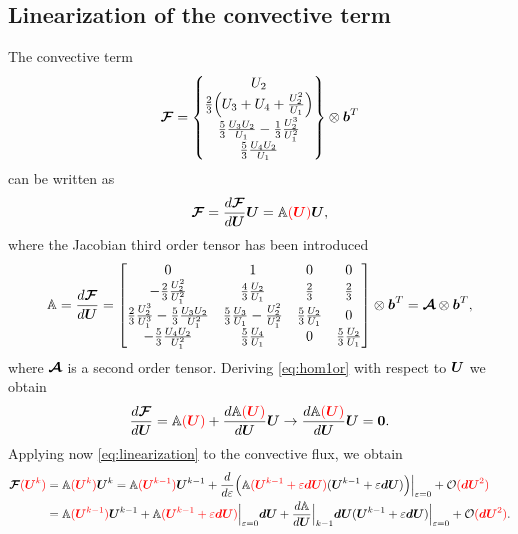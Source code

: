 \documentclass[a4paper,10pt]{article}
\newcommand{\bm}[1]{\text{\boldmath$#1$\unboldmath}}
\renewcommand{\b}{\bm{b}}
\newcommand{\DiscFunc}[1]{\bm{#1}}
\newcommand{\SecOrdTens}[1]{\bm{\mathcal{#1}}}
\renewcommand{\u}{\DiscFunc{U}}
\newcommand{\F}{\SecOrdTens{F}}
\newcommand{\A}{\SecOrdTens{A}}
\newcommand{\tot}[1]{\mathbb{#1}}  %
\newcommand{\fo}[1]{{ \color{red} ( #1 )\color{black} }} %
\begin{document}
\subsection{Linearization of the convective term}\label{sc:lin_conv}
The convective term 
\begin{equation*}
 \F =        \begin{Bmatrix}
                     U_2   \\
                  \frac{2}{3}\Big(U_3+U_4+\frac{U_2^2}{U_1}\Big) \\
                  \frac{5}{3}\frac{U_3 U_2}{U_1} -\frac{1}{3}\frac{U_2^3}{U_1^2}\\
                  \frac{5}{3} \frac{U_4 U_2}{U_1}
       \end{Bmatrix}\otimes \b^T
\end{equation*}
can be written as 
\begin{equation}\label{eq:hom1or}
 \F = \frac{d\F}{d\u}\u=\tot{A}\fo{\u} \u,
\end{equation}
where the Jacobian third order tensor has been introduced
%
\begin{equation*}
 \tot{A} = \frac{d\F}{d\u}=
                                  \begin{bmatrix}
                 0            &            1           &             0            &             0\\ 
     -\frac{2}{3} {\frac{ U_2^2}{U_1^2}} & \frac{4}{3} {\frac {U_2}{U_1}}&\frac{2}{3} & \frac{2}{3}\\ 
\frac{2}{3} \frac {U_2^3}{U_1^3}-\frac{5}{3}\frac{U_3 U_2}{U_1^2} 
& \frac{5}{3}\frac{U_3}{U_1}-\frac{U_2^2}{U_1^2}
 & \frac{5}{3} \frac { U_2}{U_1} & 0 \\ 
-\frac{5}{3} \frac {U_4 U_2}{U_1^2} & \frac{5}{3} \frac{U_4}{U_1} & 0 & \frac{5}{3} \frac { U_2}{U_1}
 \end{bmatrix}\otimes \b^T =\A\otimes\b^T,
\end{equation*}
where $\A$ is a second order tensor.
%
Deriving \eqref{eq:hom1or} with respect to $\u$ we obtain 
\begin{equation}\label{eq:rel1}
 \frac{d\F}{d\u} = \tot{A}\fo{\u} + \frac{d\tot{A}\fo{\u}}{d\u} \u \rightarrow \frac{d\tot{A}\fo{\u}}{d\u} \u = \bm{0}.
\end{equation}
Applying now \eqref{eq:linearization} to the convective flux, we obtain
\begin{equation*}
\begin{split}
 \F\fo{\u^k} &= \tot{A}\fo{\u^k}\u^k = \tot{A}\fo{\u^{k-1}}\u^{k-1}+\frac{d}{d\varepsilon}\Big(\tot{A}\fo{\u^{k-1}+\varepsilon\bm{dU}}(\u^{k-1}+\varepsilon\bm{dU})\Big)\Big|_{\varepsilon=0} + \mathcal{O}\fo{\bm{dU}^2} \\
 &=\tot{A}\fo{\u^{k-1}}\u^{k-1}+\tot{A}\fo{\u^{k-1}+\varepsilon\bm{dU}}\Big|_{\varepsilon=0} \bm{dU}+\frac{d\tot{A}}{d\u}\Big|_{k-1} \bm{dU}(\u^{k-1}+\varepsilon\bm{dU})\Big|_{\varepsilon=0}+ \mathcal{O}\fo{\bm{dU}^2}.
\end{split}
\end{equation*}
\end{document}
